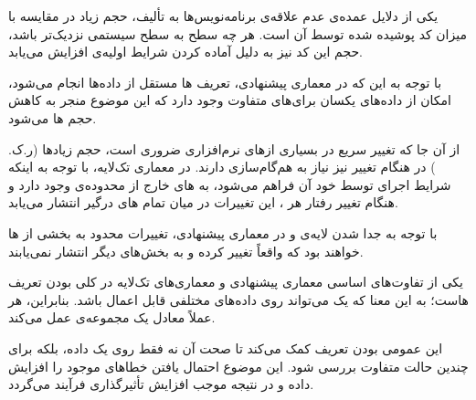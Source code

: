 
یکی از دلایل عمده‌ی عدم علاقه‌ی برنامه‌نویس‌ها به تألیف، حجم زیاد در مقایسه با میزان کد پوشیده شده توسط آن است. هر چه سطح به سطح سیستمی نزدیک‌تر باشد، حجم این کد نیز به دلیل آماده کردن شرایط اولیه‌ی  افزایش می‌یابد.

با توجه به این که در معماری پیشنهادی، تعریف ‌ها مستقل از داده‌ها انجام می‌شود، امکان  از داده‌های یکسان برای‌های متفاوت وجود دارد که این موضوع منجر به کاهش حجم ‌ها می‌شود.

از آن جا که تغییر سریع در بسیاری از‌های نرم‌افزاری ضروری است، حجم زیاد‌ها (ر.ک. ) در هنگام تغییر نیز نیاز به هم‌گام‌سازی دارند. در معماری تک‌لایه، با توجه به اینکه شرایط اجرای  توسط خود آن فراهم می‌شود،  به ‌های خارج از محدوده‌ی وجود دارد و هنگام تغییر رفتار هر ، این تغییرات در میان تمام ‌های درگیر انتشار می‌یابد.

با توجه به جدا شدن لایه‌ی  و  در معماری پیشنهادی، تغییرات محدود به بخشی از ‌ها خواهند بود که واقعاً تغییر کرده و به بخش‌های دیگر انتشار نمی‌یابند.


یکی از تفاوت‌های اساسی معماری پیشنهادی و معماری‌های تک‌لایه در کلی بودن تعریف ‌هاست؛ به این معنا که یک  می‌تواند روی داده‌های مختلفی قابل اعمال باشد. بنابراین، هر  عملاً معادل یک مجموعه‌ی  عمل می‌کند.

این عمومی بودن تعریف  کمک می‌کند تا صحت آن نه فقط روی یک داده، بلکه برای چندین حالت متفاوت بررسی شود. این موضوع احتمال یافتن خطاهای موجود را افزایش داده و در نتیجه موجب افزایش تأثیرگذاری فرآیند  می‌گردد.
